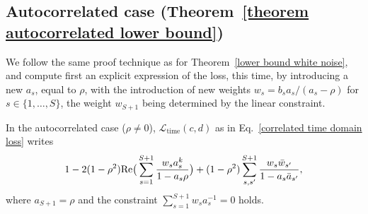 \subsection{Autocorrelated case (Theorem~\ref{theorem 
autocorrelated lower bound})}
\label{proof auto}
We follow the same proof technique as for Theorem~\ref{lower bound white noise}, and compute first an explicit expression of the loss, this time, by introducing a new $a_s$, equal to $\rho$, with the introduction of new weights $w_s = b_s a_s / ( a_s - \rho)$ for $s \in \{1,\dots,S\}$, the weight $w_{S+1}$ being determined by the linear constraint.
\begin{lemma}
    In the autocorrelated case ($\rho \neq 0$), $\mathcal{L}_\text{time}(c, d)$ as in Eq.~\eqref{correlated time domain loss} writes 
    \begin{equation}
    1 - 2(1-\rho^2)\textnormal{Re}\big(\sum_{s=1}^{S+1}\frac{w_sa_s^k}{1-a_s\rho}\big) + (1-\rho^2)\sum_{s, s'}^{S+1}\frac{w_s\bar{w}_{s'}}{1-a_s\bar{a}_{s'}},
    \label{appendix constrained autocorrelated loss}
    \end{equation}    
    where $a_{S+1}=\rho$ and the constraint $\sum_{s=1}^{S+1}w_sa_s^{-1}=0$ holds. 
    \end{lemma}

